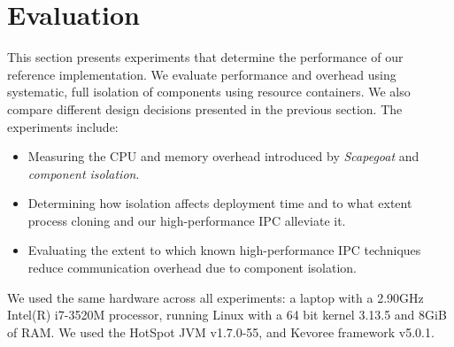 \section{Evaluation} \label{sec:evaluation}


This section presents experiments that determine the performance of our reference implementation.
We evaluate performance and overhead using systematic, full isolation of components using resource containers.
We also compare different design decisions presented in the previous section.
The experiments include:
\begin{itemize}
 \item Measuring the CPU and memory overhead introduced by \textit{Scapegoat} and \textit{component isolation}.
 \item Determining how isolation affects deployment time and to what extent process cloning and our high-performance IPC alleviate it.
 \item Evaluating the extent to which known high-performance IPC techniques reduce communication overhead due to component isolation.
\end{itemize}


We used the same hardware across all experiments: a laptop with a 2.90GHz Intel(R) i7-3520M processor, running Linux with a 64 bit kernel 3.13.5 and 8GiB of RAM.
We used the HotSpot JVM v1.7.0-55, and Kevoree framework v5.0.1.


